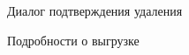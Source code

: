 \begin{figure}[H]
	\caption{Диалог подтверждения удаления}
	\label{img:csv_dumps:confirm_remove_csv}
\end{figure}
\begin{figure}[H]
	\caption{Подробности о выгрузке}
	\label{img:csv_dumps:details_csv}
\end{figure}
